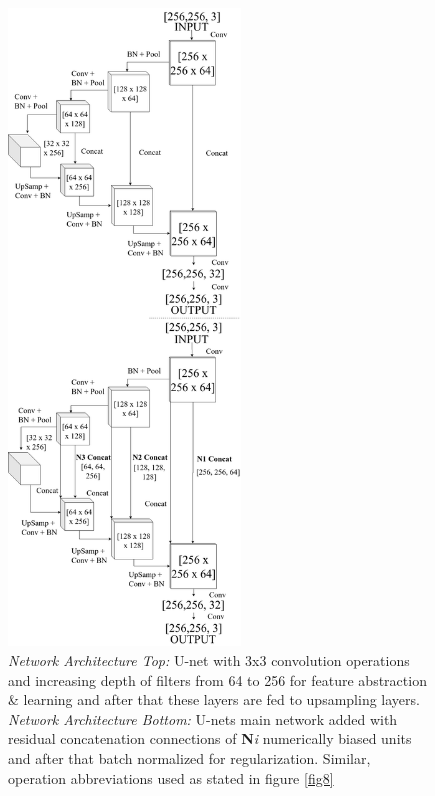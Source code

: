 \documentclass[runningheads]{llncs}
\begin{document}
\begin{figure}[!h]
\centering
\includegraphics[width=0.55\textwidth]{u-net-abstract.png}
\caption{\textit{Network Architecture Top: }U-net with 3x3 convolution operations and increasing depth of filters from 64 to 256 for feature abstraction \& learning and after that these layers are fed to upsampling layers. \textit{Network Architecture Bottom: } U-nets main network added with residual concatenation connections of \textbf{N}\textit{i} numerically biased units and after that batch normalized for regularization. Similar, operation abbreviations used as stated in figure \ref{fig8} \newline}
\label{fig9}
\end{figure}
\end{document}
